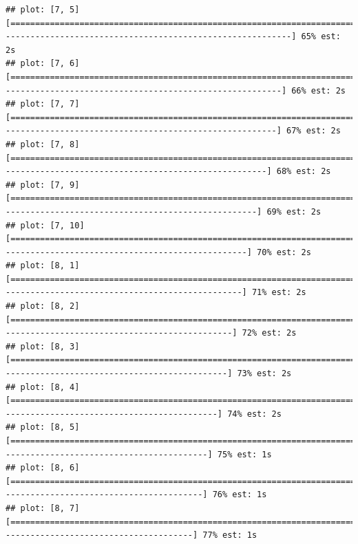 \documentclass[
]{article}
\begin{document}
\begin{verbatim}
## plot: [7, 5] [=============================================================================================================>-----------------------------------------------------------] 65% est: 2s 
## plot: [7, 6] [===============================================================================================================>---------------------------------------------------------] 66% est: 2s 
## plot: [7, 7] [================================================================================================================>--------------------------------------------------------] 67% est: 2s 
## plot: [7, 8] [==================================================================================================================>------------------------------------------------------] 68% est: 2s 
## plot: [7, 9] [====================================================================================================================>----------------------------------------------------] 69% est: 2s 
## plot: [7, 10] [=====================================================================================================================>--------------------------------------------------] 70% est: 2s 
## plot: [8, 1] [=======================================================================================================================>-------------------------------------------------] 71% est: 2s 
## plot: [8, 2] [=========================================================================================================================>-----------------------------------------------] 72% est: 2s 
## plot: [8, 3] [==========================================================================================================================>----------------------------------------------] 73% est: 2s 
## plot: [8, 4] [============================================================================================================================>--------------------------------------------] 74% est: 2s 
## plot: [8, 5] [==============================================================================================================================>------------------------------------------] 75% est: 1s 
## plot: [8, 6] [===============================================================================================================================>-----------------------------------------] 76% est: 1s 
## plot: [8, 7] [=================================================================================================================================>---------------------------------------] 77% est: 1s 

\end{verbatim}
\end{document}
